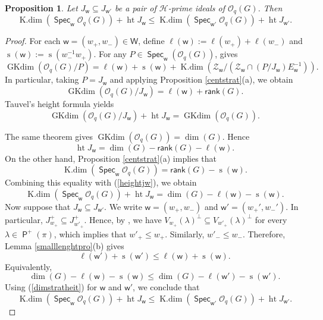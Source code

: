 \documentclass[11pt]{article}
\newtheorem{prop}[equation]{Proposition}
\theoremstyle{definition}
\numberwithin{equation}{section}
\newcommand{\qu}{\mathcal{O}}
\newcommand{\cZ}{\mathcal{Z}}
\newcommand{\Hf}{\mathcal{H}} %
\newcommand\rank{\mathsf{rank}}
\DeclareMathOperator{\GKdim}{GKdim}
\DeclareMathOperator{\kdim}{K.dim}
\DeclareMathOperator{\heit}{\mathrm{ht}}
\DeclareMathOperator{\si}{\mathrm{s}}
\DeclareMathOperator{\pois}{\mathsf{P}}
\newcommand\W{\mathsf{W}}
\newcommand\w{\mathsf{w}}
\DeclareMathOperator{\spec}{\mathsf{Spec}}
\begin{document}
  	\begin{prop}\label{pairineqh}
  Let	$J_{\w}\subseteq J_{\w'}$ be a pair of $\Hf$-prime ideals  of $\qu_q(G)$. Then
  		$$\kdim(\spec_{\w}\qu_q(G))+ \heit J_{\w}\le\kdim(\spec_{\w'}\qu_q(G))+ \heit J_{\w'}.$$
  	\end{prop}
  	
  	\begin{proof}
  		For each $\w= (w_+,w_-)\in\W$, define $\ell(\w):=\ell(w_+)+ \ell(w_-)$ and $\si(\w):= \si(w_-^{-1}w_+)$.  For any $P\in\spec_{\w}(\qu_q(G))$,  \cite[Proposition 10.3.9]{JO95} gives
  		\begin{equation}\label{gdimquo}
  			\GKdim(\qu_q(G)/P)= \ell(\w)+ \si(\w)+ \kdim(\cZ_{\w}/(\cZ_{\w}\cap(P/J_{\w})E_{\w}^{-1})).
  		\end{equation}
  		In particular, taking $P= J_{\w}$ and applying Proposition \ref{centstrat}(a), we obtain
  		\begin{equation}
  			\GKdim(\qu_q(G)/J_{\w})= \ell(\w)+ \rank(G). 
  		\end{equation}
  		Tauvel's height formula \cite[Theorem 9.4]{YA14} yields
  		\begin{equation}\label{tauvelheit}
  			\GKdim(\qu_q(G)/J_{\w})+ \heit J_{\w}= \GKdim(\qu_q(G)). 
  		\end{equation}
  		
  		The same theorem gives $\GKdim(\qu_q(G))= \dim(G).$
        Hence
  		 \begin{equation}\label{heightjw}
  		 	\heit J_{\w}= \dim(G)- \rank(G)- \ell(\w). 
  		 \end{equation}
  		 On the other hand, Proposition \ref{centstrat}(a) implies that 
  		 $$\kdim(\spec_{\w}\qu_q(G))= \rank(G)- \si(\w).$$ 
  		 Combining this equality with (\ref{heightjw}), we obtain
  		 \begin{equation}\label{dimstratheit}
  		 	\kdim(\spec_{\w}\qu_q(G))+ \heit J_{\w}= \dim(G)- \ell(\w)- \si(\w). 
  		 \end{equation}
  		 Now suppose that $J_{\w}\subseteq J_{\w'}$. We write $\w= (w_+,w_-)$ and $\w'= (w_+',w_-')$. In particular, \(J_{w_+}^{+}\subseteq J_{w'_+}^{+}\). Hence, by
  		 \cite[Proposition 4.4.5 and the proof of Lemma 10.3.6]{JO95}, we have $V_{w_+}(\lambda)^{\perp}\subseteq V_{w'_+}(\lambda)^{\perp}$ for every $\lambda\in\pois^{+}(\pi)$, which implies that $w'_+\leq w_+$. Similarly, $w'_-\leq w_-$.
  		  Therefore, Lemma \ref{smalllenghtpro}(b) gives
  		\begin{equation}\label{lengthinq}
  			\ell(\w')+ \si(\w')\le\ell(\w)+ \si(\w).
  		\end{equation}
   Equivalently,
  		\begin{equation}\label{dimstratineq}
  			\dim(G)- \ell(\w)- \si(\w)\le\dim(G)- \ell(\w')- \si(\w'). 
  		\end{equation}
  		Using (\ref{dimstratheit})  for $\w$ and $\w'$, we conclude that
  	\[
  	\kdim(\spec_{\w}\qu_q(G)) + \heit J_{\w} \le \kdim(\spec_{\w'}\qu_q(G)) + \heit J_{\w'}.
  	\]
  	\end{proof}
\end{document}
